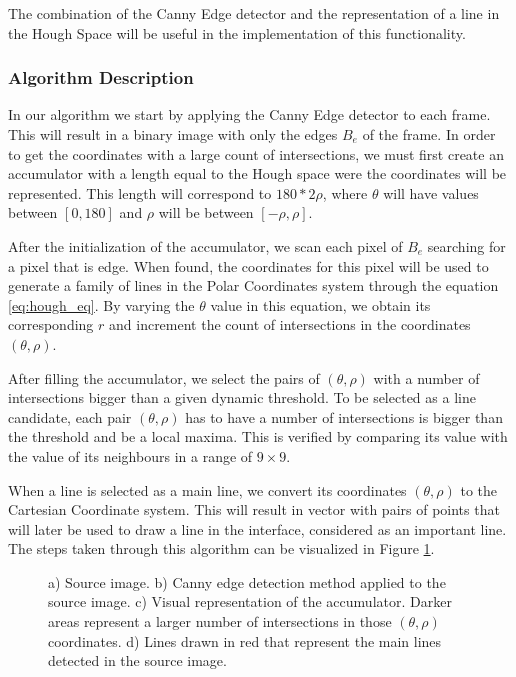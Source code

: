 The combination of the Canny Edge detector and the representation of a line in the Hough Space will be useful in the implementation of this functionality.

\subsubsection{Algorithm Description}

In our algorithm we start by applying the Canny Edge detector to each frame. This will result in a binary image with only the edges $B_{e}$ of the frame. In order to get the coordinates with a large count of intersections, we must first create an accumulator with a length equal to the Hough space were the coordinates will be represented. This length will correspond to $180 * 2\rho$, where $\theta$ will have values between $[0,180]$ and $\rho$ will be between $[-\rho,\rho]$.

After the initialization of the accumulator, we scan each pixel of $B_{e}$ searching for a pixel that is edge. When found, the coordinates for this pixel will be used to generate a family of lines in the Polar Coordinates system through the equation \ref{eq:hough_eq}. By varying the $\theta$ value in this equation, we obtain its corresponding $r$ and increment the count of intersections in the coordinates $(\theta,\rho)$.

After filling the accumulator, we select the pairs of $(\theta,\rho)$ with a number of intersections bigger than a given dynamic threshold. To be selected as a line candidate, each pair $(\theta,\rho)$ has to have a number of intersections is bigger than the threshold and be a local maxima. This is verified by comparing its value with the value of its neighbours in a range of $9 \times 9$.

When a line is selected as a main line, we convert its coordinates $(\theta,\rho)$ to the Cartesian Coordinate system. This will result in vector with pairs of points that will later be used to draw a line in the interface, considered as an important line. The steps taken through this algorithm can be visualized in Figure \ref{fig:hough_pipeline}.

\begin{figure}[htbp]
	\centering
	\begin{minipage}[b][9cm]{0.5\textwidth}
  		\centering
  		\vfill
  		\vfill
  		\renewcommand{\thesubfigure}{(d)}
  	\end{minipage}
  	\renewcommand{\thesubfigure}{(c)}
	\caption{a) Source image. b) Canny edge detection method applied to the source image. c) Visual representation of the accumulator. Darker areas represent a larger number of intersections in those $(\theta,\rho)$ coordinates. d) Lines drawn in red that represent the main lines detected in the source image.}
    \label{fig:hough_pipeline}
\end{figure}

